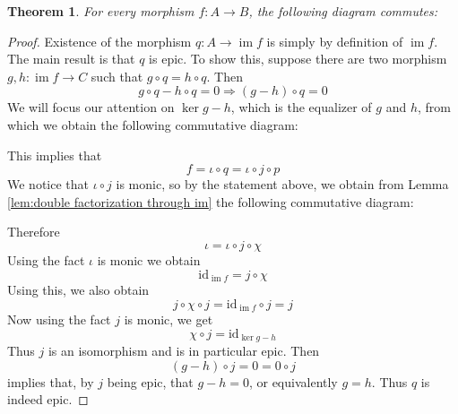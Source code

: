 \documentclass{article}
\newcommand{\id}{\mathrm{id}}
\DeclareMathOperator{\im}{im}
\DeclareMathOperator{\cok}{cok}
\newtheorem{theorem}{Theorem}[section]
\begin{document}
\begin{theorem}\label{thm:map to im is epic}
    For every morphism $f:A\to B$, the following diagram commutes:
    \begin{center}
    \end{center}
        \cite{FIT}
\end{theorem}
\begin{proof}
Existence of the morphism $q: A\to \im f$ is simply by definition of $\im f$. The main result is that $q$ is epic. To show this, suppose there are two morphism $g,h:\im f\to C$ such that $g\circ q=h\circ q$. Then 
\[
g\circ q-h\circ q=0\Rightarrow (g-h)\circ q=0 
\]
We will focus our attention on $\ker g-h$, which is the equalizer of $g$ and $h$, from which we obtain the following commutative diagram:
\begin{center}
\end{center}
This implies that
\[
f=\iota \circ q=\iota \circ j\circ p
\]
We notice that $\iota \circ j$ is monic, so by the statement above, we obtain from Lemma \ref{lem:double factorization through im} the following commutative diagram:
\begin{center}
\end{center}
Therefore
\[
\iota=\iota \circ j\circ \chi
\]
Using the fact $\iota$ is monic we obtain
\[
\id_{\im f}=j\circ \chi
\]
Using this, we also obtain
\[
j\circ \chi\circ j=\id_{\im f}\circ j=j
\]
Now using the fact $j$ is monic, we get
\[
\chi \circ j=\id_{\ker g-h}
\]
Thus $j$ is an isomorphism and is in particular epic. Then
\[
(g-h)\circ j=0=0\circ j
\]
implies that, by $j$ being epic, that $g-h=0$, or equivalently $g=h$. Thus $q$ is indeed epic.
\end{proof}
\end{document}
